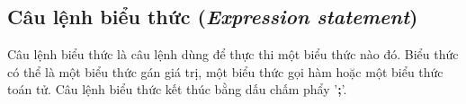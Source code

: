 \subsection{Câu lệnh biểu thức (\textit{Expression statement})}            

\regexexprstmt

Câu lệnh biểu thức là câu lệnh dùng để thực thi một biểu thức nào đó. Biểu thức có thể là một biểu thức gán giá trị, một biểu thức gọi hàm hoặc một biểu thức toán tử. Câu lệnh biểu thức kết thúc bằng dấu chấm phẩy '\textbf{;}'.
